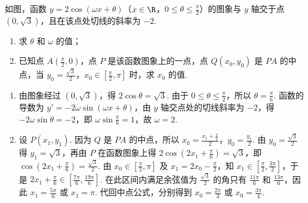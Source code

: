\begin{problem}
如图，函数 \( y = 2\cos (\omega x + \theta) \)（\(x \in \R\)，\(0 \leqslant \theta \leqslant \frac{\pi}{2}\)）的图象与 \(y\) 轴交于点 \( (0, \sqrt{3}) \)，且在该点处切线的斜率为 \(-2\).

\begin{enumerate}
\item 求 \( \theta \) 和 \( \omega \) 的值；
\item 已知点 \(A\left(\frac{\pi}{2}, 0\right)\)，点 \(P\) 是该函数图象上的一点，点 \(Q(x_0, y_0)\) 是 \(PA\) 的中点，当 \(y_0 = \frac{\sqrt{3}}{2}\)，\(x_0 \in \left[\frac{\pi}{2}, \pi\right]\) 时，求 \(x_0\) 的值.
\end{enumerate}


\begin{solution}
\begin{enumerate}
\item 由图象经过 \((0,\sqrt{3})\)，得 \(2\cos\theta=\sqrt{3}\). 由于 \(0\leqslant\theta\leqslant\frac{\pi}{2}\)，所以 \(\theta=\frac{\pi}{6}\). 函数的导数为 \(y'=-2\omega\sin(\omega x+\theta)\)，由 \(y\) 轴交点处的切线斜率为 \(-2\)，得 \(-2\omega\sin\theta=-2\)，即 \(\omega\sin\frac{\pi}{6}=1\)，故 \(\omega=2\).

\item 设 \(P(x_1,y_1)\). 因为 \(Q\) 是 \(PA\) 的中点，所以 \(x_0=\frac{x_1+\frac{\pi}{2}}{2}\)，\(y_0=\frac{y_1}{2}\). 由 \(y_0=\frac{\sqrt{3}}{2}\) 得 \(y_1=\sqrt{3}\)，再由 \(P\) 在函数图象上得 \(2\cos\left(2x_1+\frac{\pi}{6}\right)=\sqrt{3}\)，即 \(\cos\left(2x_1+\frac{\pi}{6}\right)=\frac{\sqrt{3}}{2}\). 由 \(x_0\in\left[\frac{\pi}{2},\pi\right]\) 及 \(x_1=2x_0-\frac{\pi}{2}\)，知 \(x_1\in\left[\frac{\pi}{2},\frac{3\pi}{2}\right]\)，于是 \(2x_1+\frac{\pi}{6}\in\left[\frac{7\pi}{6},\frac{19\pi}{6}\right]\). 在此区间内满足余弦值为 \(\frac{\sqrt{3}}{2}\) 的角只有 \(\frac{11\pi}{6}\) 和 \(\frac{13\pi}{6}\)，因此 \(x_1=\frac{5\pi}{6}\) 或 \(x_1=\pi\). 代回中点公式，分别得到 \(x_0=\frac{2\pi}{3}\) 或 \(x_0=\frac{3\pi}{4}\).
\end{enumerate}
\end{solution}
\end{problem}

